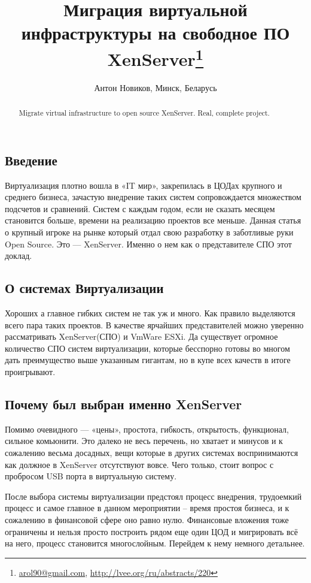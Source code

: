 \documentclass[10pt, a5paper]{article}
\begin{document}
\title{Миграция виртуальной инфраструктуры на свободное ПО XenServer\footnote{\url{arol90@gmail.com}, \url{http://lvee.org/ru/abstracts/220}}}
\author{Антон Новиков, Минск, Беларусь}
\maketitle
\begin{abstract}
Migrate virtual infrastructure to open source XenServer. Real, complete project.
\end{abstract}
\subsection*{Введение}
Виртуализация плотно вошла в «IT  мир», закрепилась в ЦОДах крупного и среднего бизнеса, зачастую внедрение таких систем сопровождается множеством подсчетов и сравнений. Систем с каждым годом, если не сказать месяцем становится больше, времени на реализацию проектов все меньше.
Данная статья о крупный игроке на рынке который отдал свою разработку в заботливые руки Open Source. Это — XenServer. Именно о нем как о представителе СПО этот доклад.

\subsection*{О системах Виртуализации}
Хороших а главное гибких систем не так уж и много. Как правило выделяются всего пара таких проектов. В качестве ярчайших представителей можно уверенно рассматривать XenServer(СПО) и VmWare ESXi. Да существует огромное количество СПО систем виртуализации, которые бесспорно готовы во многом дать преимущество выше указанным гигантам, но в купе всех качеств в итоге проигрывают.

\subsection*{Почему был выбран именно XenServer}
Помимо очевидного — «цены», простота, гибкость, открытость, функционал, сильное комьюнити.
Это далеко не весь перечень, но хватает и минусов и к сожалению весьма досадных, вещи которые в других системах воспринимаются как должное в XenServer отсутствуют вовсе.
Чего только, стоит вопрос с пробросом USB порта в виртуальную систему.

После выбора системы виртуализации предстоял процесс внедрения,  трудоемкий процесс и самое главное в данном мероприятии -- время простоя бизнеса, и к сожалению в финансовой сфере оно равно нулю. Финансовые вложения тоже ограничены и нельзя просто построить рядом еще один ЦОД и мигрировать всё на него, процесс становится многослойным. Перейдем к нему немного детальнее.
\end{document}
